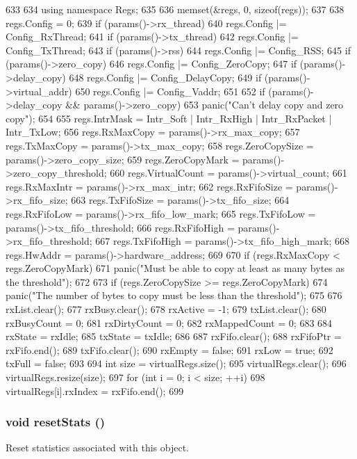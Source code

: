 \begin{DoxyCode}
633 {
634     using namespace Regs;
635 
636     memset(&regs, 0, sizeof(regs));
637 
638     regs.Config = 0;
639     if (params()->rx_thread)
640         regs.Config |= Config_RxThread;
641     if (params()->tx_thread)
642         regs.Config |= Config_TxThread;
643     if (params()->rss)
644         regs.Config |= Config_RSS;
645     if (params()->zero_copy)
646         regs.Config |= Config_ZeroCopy;
647     if (params()->delay_copy)
648         regs.Config |= Config_DelayCopy;
649     if (params()->virtual_addr)
650         regs.Config |= Config_Vaddr;
651 
652     if (params()->delay_copy && params()->zero_copy)
653         panic("Can't delay copy and zero copy");
654 
655     regs.IntrMask = Intr_Soft | Intr_RxHigh | Intr_RxPacket | Intr_TxLow;
656     regs.RxMaxCopy = params()->rx_max_copy;
657     regs.TxMaxCopy = params()->tx_max_copy;
658     regs.ZeroCopySize = params()->zero_copy_size;
659     regs.ZeroCopyMark = params()->zero_copy_threshold;
660     regs.VirtualCount = params()->virtual_count;
661     regs.RxMaxIntr = params()->rx_max_intr;
662     regs.RxFifoSize = params()->rx_fifo_size;
663     regs.TxFifoSize = params()->tx_fifo_size;
664     regs.RxFifoLow = params()->rx_fifo_low_mark;
665     regs.TxFifoLow = params()->tx_fifo_threshold;
666     regs.RxFifoHigh = params()->rx_fifo_threshold;
667     regs.TxFifoHigh = params()->tx_fifo_high_mark;
668     regs.HwAddr = params()->hardware_address;
669 
670     if (regs.RxMaxCopy < regs.ZeroCopyMark)
671         panic("Must be able to copy at least as many bytes as the threshold");
672 
673     if (regs.ZeroCopySize >= regs.ZeroCopyMark)
674         panic("The number of bytes to copy must be less than the threshold");
675 
676     rxList.clear();
677     rxBusy.clear();
678     rxActive = -1;
679     txList.clear();
680     rxBusyCount = 0;
681     rxDirtyCount = 0;
682     rxMappedCount = 0;
683 
684     rxState = rxIdle;
685     txState = txIdle;
686 
687     rxFifo.clear();
688     rxFifoPtr = rxFifo.end();
689     txFifo.clear();
690     rxEmpty = false;
691     rxLow = true;
692     txFull = false;
693 
694     int size = virtualRegs.size();
695     virtualRegs.clear();
696     virtualRegs.resize(size);
697     for (int i = 0; i < size; ++i)
698         virtualRegs[i].rxIndex = rxFifo.end();
699 }
\end{DoxyCode}
\hypertarget{classSinic_1_1Device_a65880e61108132689a1bd769b9187fb7}{
\subsubsection[{resetStats}]{\setlength{\rightskip}{0pt plus 5cm}void resetStats ()}}
\label{classSinic_1_1Device_a65880e61108132689a1bd769b9187fb7}
Reset statistics associated with this object. 

